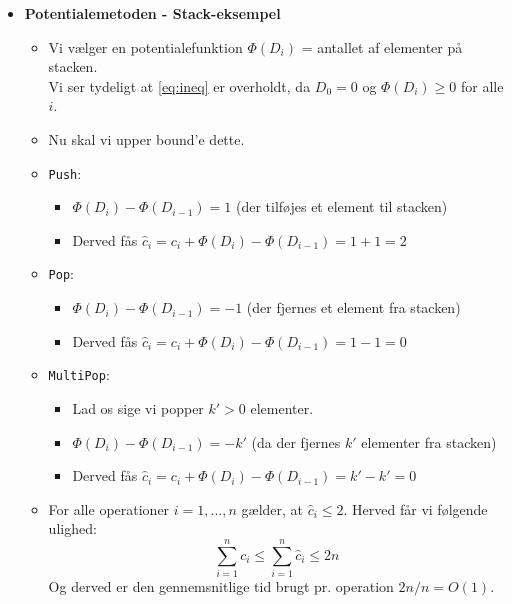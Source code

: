 \begin{itemize}
\item \textbf{Potentialemetoden - Stack-eksempel}
\begin{itemize}
	\item Vi vælger en potentialefunktion $\Phi(D_i)$ = antallet af elementer på stacken.\\
	Vi ser tydeligt at \cref{eq:ineq} er overholdt, da $D_0 = 0$ og $\Phi(D_i) \geq 0$ for alle $i$.
	\item Nu skal vi upper bound'e dette.
	\item \texttt{Push}:
	\begin{itemize}
		\item $\Phi(D_i) - \Phi(D_{i-1}) = 1$ (der tilføjes et element til stacken)
		\item Derved fås $\hat c_i = c_i + \Phi(D_i) - \Phi(D_{i-1}) = 1+1 = 2$
	\end{itemize}
	\item \texttt{Pop}:
	\begin{itemize}
		\item $\Phi(D_i) - \Phi(D_{i-1}) = -1$ (der fjernes et element fra stacken)
		\item Derved fås $\hat c_i = c_i + \Phi(D_i) - \Phi(D_{i-1}) = 1-1 = 0$
	\end{itemize}
	\item \texttt{MultiPop}:
	\begin{itemize}
		\item Lad os sige vi popper $k' > 0$ elementer.
		\item $\Phi(D_i) - \Phi(D_{i-1}) = -k'$ (da der fjernes $k'$ elementer fra stacken)
		\item Derved fås $\hat c_i = c_i + \Phi(D_i) - \Phi(D_{i-1}) = k' - k' = 0$
	\end{itemize}
	\item For alle operationer $i = 1, ..., n$ gælder, at $\hat c_i \leq 2$. Herved får vi følgende ulighed:
	$$
	\sum_{i=1}^n c_i \leq \sum_{i=1}^n \hat c_i \leq 2n
	$$
	Og derved er den gennemsnitlige tid brugt pr. operation $2n/n = O(1)$.
\end{itemize}



\end{itemize}
